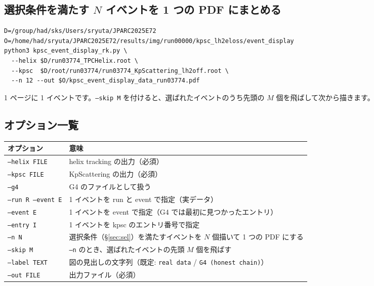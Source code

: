\documentclass[a4paper,10pt]{ltjsarticle}
\begin{document}
\subsection{選択条件を満たす $N$ イベントを 1 つの PDF にまとめる}
\begin{Verbatim}
D=/group/had/sks/Users/sryuta/JPARC2025E72
O=/home/had/sryuta/JPARC2025E72/results/img/run00000/kpsc_lh2eloss/event_display
python3 kpsc_event_display_rk.py \
  --helix $D/run03774_TPCHelix.root \
  --kpsc  $D/root/run03774/run03774_KpScattering_lh2off.root \
  --n 12 --out $O/kpsc_event_display_data_run03774.pdf
\end{Verbatim}
1 ページに 1 イベントです。\texttt{--skip M} を付けると、選ばれたイベントのうち先頭の $M$ 個を飛ばして次から描きます。

\subsection{オプション一覧}
\begin{table}[H]
\centering\small
\begin{tabular}{lp{}}
\toprule
オプション & 意味 \\
\midrule
\texttt{--helix FILE} & helix tracking の出力（必須） \\
\texttt{--kpsc FILE} & KpScattering の出力（必須） \\
\texttt{--g4} & G4 のファイルとして扱う \\
\texttt{--run R --event E} & 1 イベントを run と event で指定（実データ） \\
\texttt{--event E} & 1 イベントを event で指定（G4 では最初に見つかったエントリ） \\
\texttt{--entry I} & 1 イベントを kpsc のエントリ番号で指定 \\
\texttt{--n N} & 選択条件（\S\ref{sec:sel}）を満たすイベントを $N$ 個描いて 1 つの PDF にする \\
\texttt{--skip M} & \texttt{--n} のとき、選ばれたイベントの先頭 $M$ 個を飛ばす \\
\texttt{--label TEXT} & 図の見出しの文字列（既定: \texttt{real data} / \texttt{G4 (honest chain)}） \\
\texttt{--out FILE} & 出力ファイル（必須） \\
\bottomrule
\end{tabular}
\end{table}
\end{document}

